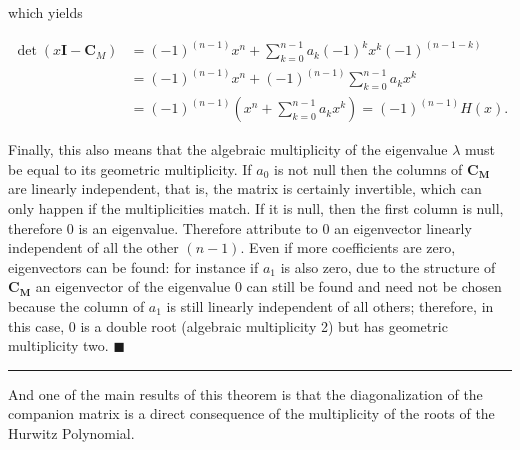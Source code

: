 	which yields

\begin{align}
	\det\left(x \mathbf{I} - \mathbf{C}_M\right) &= \left(-1\right)^{(n-1)}x^n + \sum\limits_{k=0}^{n-1} a_k \left(-1\right)^{k}x^k \left(-1\right)^{\left(n-1-k\right)} \nonumber\\[5mm]
%
	 &= \left(-1\right)^{\left(n-1\right)}x^n + \left(-1\right)^{\left(n-1\right)}\sum\limits_{k=0}^{n-1} a_k x^k \nonumber\\[5mm]
%
	 &= \left(-1\right)^{\left(n-1\right)}\left(x^n + \sum\limits_{k=0}^{n-1} a_k x^k\right) = \left(-1\right)^{\left(n-1\right)}H(x) .
\end{align}

	Finally, this also means that the algebraic multiplicity of the eigenvalue $\lambda$ must be equal to its geometric multiplicity. If $a_0$ is not null then the columns of $\mathbf{C_M}$ are linearly independent, that is, the matrix is certainly invertible, which can only happen if the multiplicities match. If it is null, then the first column is null, therefore $0$ is an eigenvalue. Therefore attribute to $0$ an eigenvector linearly independent of all the other $(n-1)$. Even if more coefficients are zero, eigenvectors can be found: for instance if $a_1$ is also zero, due to the structure of $\mathbf{C_M}$ an eigenvector of the eigenvalue $0$ can still be found and need not be chosen because the column of $a_1$ is still linearly independent of all others; therefore, in this case, $0$ is a double root (algebraic multiplicity 2) but has geometric multiplicity two.
\hfill$\blacksquare$
\vspace{5mm}
\hrule
\vspace{5mm} %

	And one of the main results of this theorem is that the diagonalization of the companion matrix is a direct consequence of the multiplicity of the roots of the Hurwitz Polynomial.

